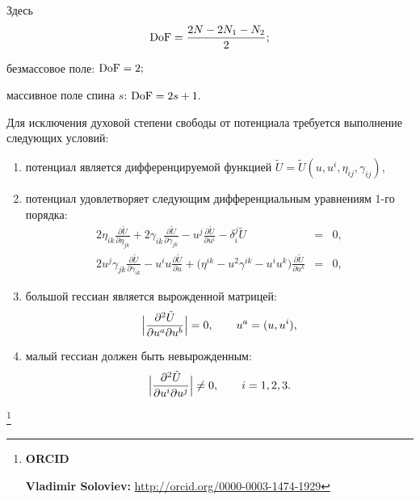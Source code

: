 \bigskip

Здесь $${\rm DoF}=\frac{2N-2N_1-N_2}{2};$$

безмассовое поле: $\rm DoF =2;$

массивное поле спина $s$: ${\rm DoF}=2s+1.$

\smallskip
 

Для исключения духовой степени свободы от потенциала требуется выполнение следующих условий: 
\begin{enumerate}
\item  потенциал является дифференцируемой функцией  $ \tilde U= \tilde U(u,u^i,\eta_{ij},\gamma_{ij})$, 
\item потенциал удовлетворяет следующим дифференциальным уравнениям 1-го порядка:
$$
\begin{array}{rcl}
\displaystyle
2\eta_{ik}\frac{\partial\tilde{U}}{\partial\eta_{jk}}+2\gamma_{ik}\frac{\partial\tilde{U}}{\partial\gamma_{jk}}-u^j\frac{\partial\tilde{U}}{\partial u^i}-\delta^j_i\tilde{U}&=&0, \\[2mm]
\displaystyle
 2u^j\gamma_{jk}\frac{\partial\tilde{U}}{\partial\gamma_{ik}}-u^i u\frac{\partial\tilde{U}}{\partial u}+
 \bigl(\eta^{ik}-u^2\gamma^{ik}-u^i u^k \bigr)\frac{\partial\tilde{U}}{\partial u^k}&=&0, 
\end{array}
$$
\item большой гессиан является вырожденной матрицей:
$$
\Bigl|\frac{\partial^2 \tilde U}{\partial u^a\partial u^b}\Bigr|=0,\qquad u^a=(u,u^i),$$
\item малый гессиан должен быть невырожденным:
$$
\Bigl|\frac{\partial^2 \tilde U}{\partial u^i\partial u^j}\Bigr |\ne 0,\qquad i=1, 2, 3. $$
\end{enumerate}

\thanks{{\bf ORCID}

{\bf Vladimir Soloviev:} \url{http://orcid.org/0000-0003-1474-1929}


}


\RusRef





